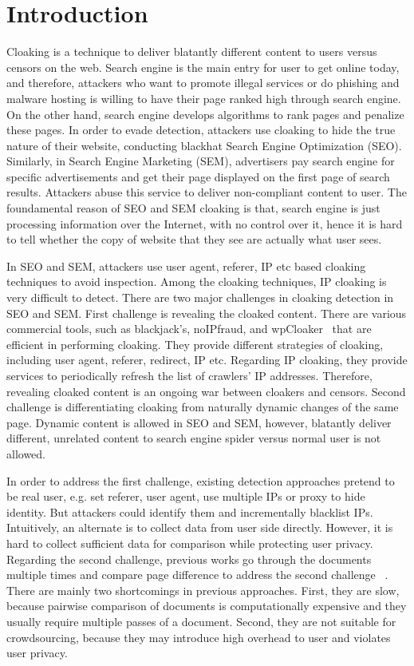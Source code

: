 \section{Introduction}
\label{s:intro}

Cloaking is a technique to deliver blatantly different content to users versus
censors on the web. 
Search engine is the main entry for user to get online today, and therefore,
attackers who want to promote illegal services or do phishing and malware
hosting is willing to have their page ranked high through search engine.
On the other hand, search engine develops algorithms to rank pages and penalize
these pages. In order to evade detection, attackers use cloaking to hide the
true nature of their website, conducting blackhat Search Engine Optimization (SEO).
Similarly, in Search Engine Marketing (SEM), advertisers pay search engine for
specific advertisements and get their page displayed on the first page of search
results. Attackers abuse this service to deliver non-compliant content to user.
The foundamental reason of SEO and SEM cloaking is that, search engine is just processing
information over the Internet, with no control over it, hence it is hard to
tell whether the copy of website that they see are actually what user sees.

In SEO and SEM, attackers use user agent, referer, IP etc based cloaking
techniques to avoid inspection. Among the cloaking techniques, IP cloaking is
very difficult to detect. 
There are two major challenges in cloaking detection in SEO and SEM.
First challenge is revealing the cloaked content. There are various
commercial tools, such as blackjack's, noIPfraud, and wpCloaker~\cite{intro:cloakware}
that are efficient in performing cloaking.
They provide different strategies of cloaking, including user agent, referer,
redirect, IP etc. Regarding IP cloaking, they provide services to periodically refresh the list of
crawlers' IP addresses. Therefore, revealing cloaked content is an ongoing war
between cloakers and censors.
Second challenge is differentiating
cloaking from naturally dynamic changes of the same page. Dynamic content is
allowed in SEO and SEM, however, blatantly deliver different, unrelated content
to search engine spider versus normal user is not allowed.

In order to address the first challenge, existing detection approaches pretend to be real user, e.g. set
referer, user agent, use multiple IPs or proxy to hide identity. But
attackers could identify them and incrementally blacklist IPs.
Intuitively, an alternate is to collect data from user side directly. However, it is hard
to collect sufficient data for comparison while protecting user privacy.
Regarding the second challenge, previous works go through the documents multiple times and compare page
difference to address the second challenge ~\cite{chellapilla2006improving, deng2013uncovering,
lin2009detection, wang2011cloak}.
There are mainly two shortcomings in previous approaches.
First,  they are slow, because pairwise comparison of documents is
computationally expensive and they usually require multiple passes of a
document.
Second, they are not suitable for crowdsourcing, because they may introduce
high overhead to user and violates user privacy. 

